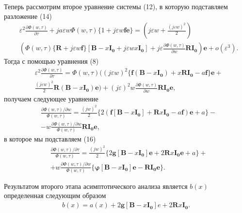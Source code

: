 Теперь рассмотрим второе уравнение системы (12), в которую подставляем разложение (14)
\begin{align*}
	&\varepsilon^2 \frac{\partial \Phi (w,\tau)}{\partial \tau}+ja\varepsilon w \Phi (w,\tau)\{1+j\varepsilon w\boldsymbol{f}\boldsymbol{e}\}=(j\varepsilon w +\frac{(j\varepsilon w)^2}{2})\\
	&(\Phi(w,\tau)\{\boldsymbol{R}+j\varepsilon w \boldsymbol{f}\} [\boldsymbol{B}-x\boldsymbol{I_{0}}+j\varepsilon wx\boldsymbol{I_{0}}]+j\varepsilon \frac{\partial \Phi(w,\tau)}{\partial w}\boldsymbol{RI_{0}})\boldsymbol{e} +o(\varepsilon^3).
\end{align*}
Тогда с помощью уравнения (8)
\begin{align*}
	&\varepsilon^2 \frac{\partial \Phi (w,\tau)}{\partial \tau}=\Phi(w,\tau)((j\varepsilon w)^2\{\boldsymbol{f}(\boldsymbol{B}-x\boldsymbol{I_{0}})+x\boldsymbol{RI_{0}}-a\boldsymbol{f}\}\boldsymbol{e}+\\
	&\frac{(j\varepsilon w)^2}{2}\boldsymbol{R}(\boldsymbol{B}-x\boldsymbol{I_{0}})\boldsymbol{e})+(j\varepsilon)^2 w\frac{\partial \Phi(w,\tau)}{\partial w}\boldsymbol{RI_{0}e},
\end{align*}
получаем следующее уравнение
\begin{align*}
	&\frac{\partial \Phi(w,\tau)/\partial w}{ \Phi(w,\tau)}=\frac{(jw)^2}{2}\{2(\boldsymbol{f}[\boldsymbol{B}-x\boldsymbol{I_{0}}] +\boldsymbol{R}x\boldsymbol{I_{0}}-a\boldsymbol{f})\boldsymbol{e}+a\}-\\
	&-w\frac{\partial \Phi(w,\tau)/\partial w}{\Phi(w,\tau)}\boldsymbol{RI_{0}e},
\end{align*} 
в которое мы подставляем (16)
\begin{equation}
	\begin{split}
		&\frac{\partial \Phi(w,\tau)/\partial \tau}{\Phi(w,\tau)}=\frac{(jw)^2}{2}\{2\boldsymbol{g}[\boldsymbol{B}-x\boldsymbol{I_{0}}] \boldsymbol{e} +2\boldsymbol{R}x\boldsymbol{I_{0}e}+a\}+\\
		&+w\frac{\partial \Phi(w,\tau)/\partial w}{\Phi(w,\tau)}\{\boldsymbol{\varphi}[\boldsymbol{B}-x\boldsymbol{I_{0}}] \boldsymbol{e}-\boldsymbol{RI_{0}e}\}.
	\end{split}
\end{equation}

Результатом второго этапа асимптотического анализа является $b(x)$ определенная следующим образом
\begin{equation}
	\begin{split}
		b(x)=a(x)+2\boldsymbol{g}[\boldsymbol{B}-x\boldsymbol{I_{0}}]e+2\boldsymbol{R}x\boldsymbol{I_{0}}.
	\end{split}
\end{equation}
\newpage
